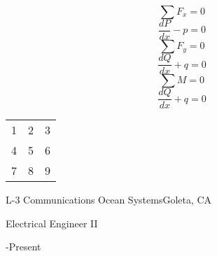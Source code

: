 \documentclass[letterpaper, 10pt]{article}
\begin{document}
\noindent \begin{minipage}[t]{0.5\textwidth}

\setlength{\multicolsep}{6.0pt plus 2.0pt minus 1.5pt}%

\begin{multicols}{3}
   \noindent
   \begin{equation}\sum F_x = 0\end{equation}
   \begin{equation}\frac{dP}{dx} - p = 0\end{equation}
   \begin{equation}\sum F_y = 0\end{equation}
   \begin{equation}\frac{dQ}{dx} + q = 0\end{equation}
   \begin{equation}\sum M = 0\end{equation}
   \begin{equation}\frac{dQ}{dx} + q = 0\end{equation}
\end{multicols}

\begin{tabular}{ l c r }
  1 & 2 & 3 \\
  4 & 5 & 6 \\
  7 & 8 & 9 \\
\end{tabular}



\begin{multicols}{2} \noindent \raggedright L-3 Communications Ocean Systems\vfill \columnbreak \noindent \raggedleft Goleta, CA\end{multicols}
\par{}
%
\noindent \begin{minipage}[t]{\mylength}\noindent \raggedright Electrical Engineer II\\ \end{minipage}
\noindent \begin{minipage}[t]{\dimexpr \textwidth - \mylength \relax}\noindent {}-Present\\ \end{minipage}\\


\end{minipage}
\end{document}
